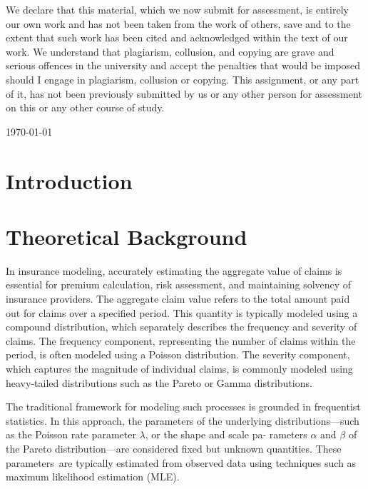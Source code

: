 \documentclass{Class/julia}
\begin{document}
\begin{titlepage}
\begin{center}
\begin{figure}[h!]
\end{figure}
\end{center}
\vfill
\begin{center}
{\small{We declare that this material, which we now submit for assessment, is entirely our own work and has not been taken from the work of others, save and to the extent that such work has been cited and acknowledged within the text of our work. We understand that plagiarism, collusion, and copying are grave and serious offences in the university and accept the penalties that would be imposed should I engage in plagiarism, collusion or copying. This assignment, or any part of it, has not been previously submitted by us or any other person for assessment on this or any other course of study.}}
\end{center}
\vfill
    {\large \today \par}
    \vfill
\end{titlepage}

\tableofcontents

\section{Introduction}

\section{Theoretical Background}

In insurance modeling, accurately estimating the aggregate value of claims is essential for premium calculation, risk assessment, and maintaining solvency of insurance providers. The aggregate claim value refers to the total amount paid out for claims over a specified period. This quantity is typically modeled using a compound distribution, which separately describes the frequency and severity of claims. The frequency component, representing the number of claims within the period, is often modeled using a Poisson distribution. The severity component, which captures the magnitude of individual claims, is commonly modeled using heavy-tailed distributions such as the Pareto or Gamma distributions.

The traditional framework for modeling such processes is grounded in frequentist statistics. In this approach, the parameters of the underlying distributions—such as the Poisson rate parameter \( \lambda \), or the shape and scale pa- rameters \( \alpha \) and \( \beta \) of the Pareto distribution—are considered fixed but unknown quantities. These parameters~are typically estimated from observed data using techniques such as maximum likelihood estimation (MLE).
\end{document}
